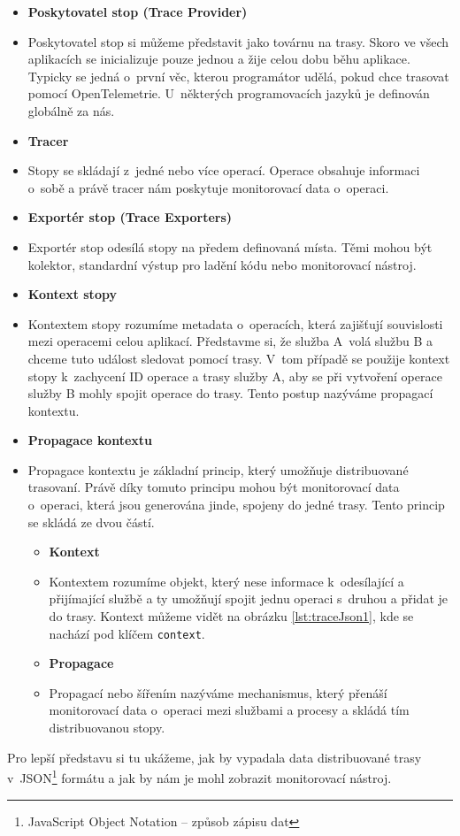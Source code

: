 \begin{itemize}
  \item{\textbf{Poskytovatel stop (Trace Provider)}}
  \item[]
Poskytovatel stop si můžeme představit jako továrnu na trasy. Skoro ve všech aplikacích se inicializuje pouze jednou a žije celou dobu běhu aplikace. Typicky se jedná o~první věc, kterou programátor udělá, pokud chce trasovat pomocí OpenTelemetrie. U~některých programovacích jazyků je definován globálně za nás.
  \item{\textbf{Tracer}}
  \item[]
Stopy se skládají z~jedné nebo více operací. Operace obsahuje informaci o~sobě a právě tracer nám poskytuje monitorovací data o~operaci.
  \item{\textbf{Exportér stop (Trace Exporters)}}
  \item[]
  Exportér stop odesílá stopy na předem definovaná místa. Těmi mohou být kolektor, standardní výstup pro ladění kódu nebo monitorovací nástroj.
  \item{\textbf{Kontext stopy}}
  \item[]
  Kontextem stopy rozumíme metadata o~operacích, která zajišťují souvislosti mezi operacemi celou aplikací. Představme si, že služba A~volá službu B a chceme tuto událost sledovat pomocí trasy. V~tom případě se použije kontext stopy k~zachycení ID operace a trasy služby A, aby se při vytvoření operace služby B mohly spojit operace do trasy. Tento postup nazýváme propagací kontextu.
  \item{\textbf{Propagace kontextu}}
  \item[]
  Propagace kontextu je základní princip, který umožňuje distribuované trasovaní. Právě díky tomuto principu mohou být monitorovací data o~operaci, která jsou generována jinde, spojeny do jedné trasy. Tento princip se skládá ze dvou částí.
  \begin{itemize}
  \item{\textbf{Kontext}}
  \item[]
  Kontextem rozumíme objekt, který nese informace k~odesílající a přijímající službě a ty umožňují spojit jednu operaci s~druhou a přidat je do trasy. Kontext můžeme vidět na obrázku \ref{lst:traceJson1}, kde se nachází pod klíčem \texttt{context}.
  \item{\textbf{Propagace}}
  \item[]
   Propagací nebo šířením nazýváme mechanismus, který přenáší monitorovací data o~operaci mezi službami a procesy a skládá tím distribuovanou stopy.
  \end{itemize}
\end{itemize}
Pro lepší představu si tu ukážeme, jak by vypadala data distribuované trasy v~JSON\footnote{JavaScript Object Notation – způsob zápisu dat} formátu a jak by nám je mohl zobrazit monitorovací nástroj.


